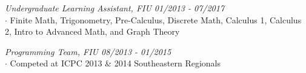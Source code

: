 \documentclass[UTF8, line, margin]{res}
\begin{document}
\begin{resume}

\textit{Undergraduate Learning Assistant, FIU \hfill 01/2013 - 07/2017}\\
$\cdot$ Finite Math, Trigonometry, Pre-Calculus, Discrete Math, Calculus 1,
Calculus 2, Intro to Advanced Math, and Graph Theory

\textit{Programming Team, FIU \hfill 08/2013 - 01/2015}\\
$\cdot$ Competed at ICPC 2013 \& 2014 Southeastern Regionals

\end{resume}
\end{document}
